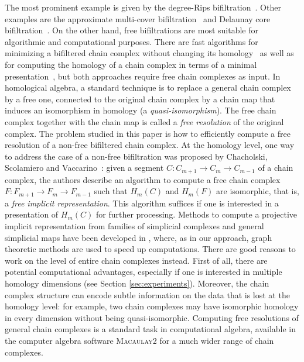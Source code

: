 \documentclass[11pt]{article}
\newcommand{\define}[1]{\emph{#1}} %
\begin{document}
The most prominent example is given by the degree-Rips bifiltration~\cite{lw-rivet,rolle-socg,rs-stable,bl-stability}.
Other examples
are the approximate multi-cover bifiltration~\cite{alonso-sparse} and Delaunay core bifiltration~\cite{Core_bifilt}.
On the other hand, free bifiltrations are most suitable for algorithmic and computational purposes.
There are fast algorithms for minimizing a bifiltered chain complex without changing its homology~\cite{fk-chunk,fkr-compression,ms-computing}
as well as for computing the homology of a chain complex in terms of a minimal presentation~\cite{lw-computing,kr-fast,fkr-compression,bll-efficient}, 
but both approaches require free chain complexes as input. 
%
%
In homological algebra, a standard technique is to replace a general chain complex by a free one, connected to the original chain complex by a chain map that induces an isomorphism in homology (a \define{quasi-isomorphism}).
The free chain complex together with the chain map is called a \define{free resolution} of the original complex.
The problem studied in this paper is how to efficiently compute a free resolution of a non-free bifiltered chain complex. 
%
At the homology level, one way to address the case of a non-free bifiltration was proposed by Chacholski,
Scolamiero and Vaccarino~\cite{swedish}: given a segment  $C:C_{m+1}\to C_m\to C_{m-1}$ of a chain complex, the authors describe an algorithm to compute a free chain complex
$F:F_{m+1}\to F_m\to F_{m-1}$ such that $H_m(C)$ and $H_m(F)$ are isomorphic, that is, a \define{free implicit representation}.
This algorithm suffices if one is interested in a presentation
of $H_m(C)$ for further processing. Methods to compute a projective implicit representation from families of simplicial complexes and general simplicial maps have been developed in \cite{dey2025computingprojectiveimplicitrepresentations,dey_et_al:LIPIcs.SoCG.2024.51}, where, as in our approach, graph theoretic methods are used to speed up computations.
%
There are good reasons to work on the level of entire chain complexes instead.
First of all, there are potential computational advantages, especially if one is interested in multiple homology dimensions (see Section \ref{sec:experiments}). 
Moreover, the chain complex structure can encode subtle information on the data that is lost at the homology level: for example, two chain complexes may have isomorphic homology in every dimension without being quasi-isomorphic. 
%
Computing free resolutions of general chain complexes is a standard task in computational algebra, available in the computer algebra software \textsc{Macaulay2} for a much wider range of chain complexes.
\end{document}

